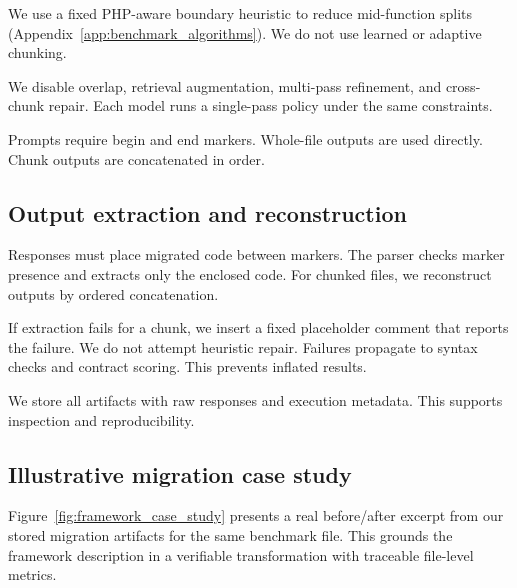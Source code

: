 We use a fixed PHP-aware boundary heuristic to reduce mid-function splits (Appendix~\ref{app:benchmark_algorithms}).
We do not use learned or adaptive chunking.

We disable overlap, retrieval augmentation, multi-pass refinement, and cross-chunk repair.
Each model runs a single-pass policy under the same constraints.

Prompts require begin and end markers.
Whole-file outputs are used directly.
Chunk outputs are concatenated in order.

\subsection{Output extraction and reconstruction}
\label{sec:framework_reconstruction}

Responses must place migrated code between markers.
The parser checks marker presence and extracts only the enclosed code.
For chunked files, we reconstruct outputs by ordered concatenation.

If extraction fails for a chunk, we insert a fixed placeholder comment that reports the failure.
We do not attempt heuristic repair.
Failures propagate to syntax checks and contract scoring.
This prevents inflated results.

We store all artifacts with raw responses and execution metadata.
This supports inspection and reproducibility.

\subsection{Illustrative migration case study}
\label{sec:framework_case_study}

Figure~\ref{fig:framework_case_study} presents a real before/after excerpt
from our stored migration artifacts for the same benchmark file.
This grounds the framework description in a verifiable transformation with
traceable file-level metrics.

